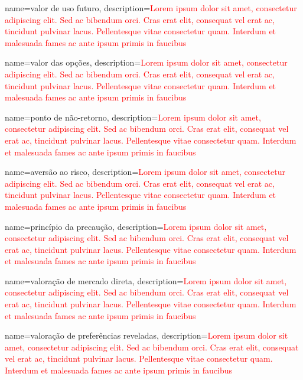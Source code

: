 {
	name=valor de uso futuro,
	description={\textcolor{red}{Lorem ipsum dolor sit amet, consectetur adipiscing elit. Sed ac bibendum orci. Cras erat elit, consequat vel erat ac, tincidunt pulvinar lacus. Pellentesque vitae consectetur quam. Interdum et malesuada fames ac ante ipsum primis in faucibus}}
}

{
	name=valor das opções,
	description={\textcolor{red}{Lorem ipsum dolor sit amet, consectetur adipiscing elit. Sed ac bibendum orci. Cras erat elit, consequat vel erat ac, tincidunt pulvinar lacus. Pellentesque vitae consectetur quam. Interdum et malesuada fames ac ante ipsum primis in faucibus}}
}

{
	name=ponto de não-retorno,
	description={\textcolor{red}{Lorem ipsum dolor sit amet, consectetur adipiscing elit. Sed ac bibendum orci. Cras erat elit, consequat vel erat ac, tincidunt pulvinar lacus. Pellentesque vitae consectetur quam. Interdum et malesuada fames ac ante ipsum primis in faucibus}}
}

{
	name=aversão ao risco,
	description={\textcolor{red}{Lorem ipsum dolor sit amet, consectetur adipiscing elit. Sed ac bibendum orci. Cras erat elit, consequat vel erat ac, tincidunt pulvinar lacus. Pellentesque vitae consectetur quam. Interdum et malesuada fames ac ante ipsum primis in faucibus}}
}

{
	name=princípio da precaução,
	description={\textcolor{red}{Lorem ipsum dolor sit amet, consectetur adipiscing elit. Sed ac bibendum orci. Cras erat elit, consequat vel erat ac, tincidunt pulvinar lacus. Pellentesque vitae consectetur quam. Interdum et malesuada fames ac ante ipsum primis in faucibus}}
}

{
	name=valoração de mercado direta,
	description={\textcolor{red}{Lorem ipsum dolor sit amet, consectetur adipiscing elit. Sed ac bibendum orci. Cras erat elit, consequat vel erat ac, tincidunt pulvinar lacus. Pellentesque vitae consectetur quam. Interdum et malesuada fames ac ante ipsum primis in faucibus}}
}

{
	name=valoração de preferências reveladas,
	description={\textcolor{red}{Lorem ipsum dolor sit amet, consectetur adipiscing elit. Sed ac bibendum orci. Cras erat elit, consequat vel erat ac, tincidunt pulvinar lacus. Pellentesque vitae consectetur quam. Interdum et malesuada fames ac ante ipsum primis in faucibus}}
}

